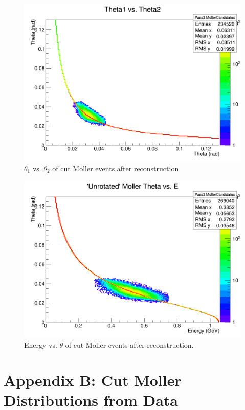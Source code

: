 \documentclass{article}
\begin{document}
	\begin{figure}[H]
  	\includegraphics[width=\linewidth]{PostCollabMeet/Pass3PureMoller/CUT_PlotTT.png}
  	\caption{$\theta_1$ vs. $\theta_2$ of cut Moller events after reconstruction}
  	\label{fig:cutTT}
	\end{figure}
	
	\begin{figure}[H]
  	\includegraphics[width=\linewidth]{PostCollabMeet/Pass3PureMoller/CUT_Unrotmoller_ThetaE.png}
  	\caption{Energy vs. $\theta$ of cut Moller events after reconstruction.}
  	\label{fig:cutET}
	\end{figure}
	
	\section{Appendix B: Cut Moller Distributions from Data}
	
\end{document}

